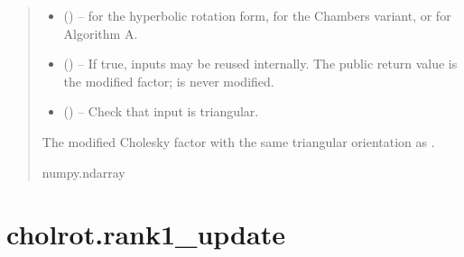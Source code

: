 \documentclass[a4paper,11pt,english]{sphinxmanual}
\begin{document}
\begin{fulllineitems}
\begin{quote}
\begin{description}
\begin{itemize}
\item {} 
\sphinxAtStartPar
{} (\sphinxstyleliteralemphasis{\sphinxupquote{{[}}}\sphinxstyleliteralemphasis{\sphinxupquote{, }}\sphinxstyleliteralemphasis{\sphinxupquote{, }}\sphinxstyleliteralemphasis{\sphinxupquote{, }}\sphinxstyleliteralemphasis{\sphinxupquote{{]}}}) –  for the hyperbolic rotation form,  for the Chambers
variant, or  for Algorithm A.

\item {} 
\sphinxAtStartPar
{} () – If true, inputs may be reused internally. The public return value is the
modified factor;  is never modified.

\item {} 
\sphinxAtStartPar
{} () – Check that input is triangular.

\end{itemize}

\sphinxAtStartPar
The modified Cholesky factor  with the same triangular orientation
as .

\sphinxAtStartPar
numpy.ndarray

\end{description}\end{quote}

\end{fulllineitems}


\sphinxstepscope


\section{cholrot.rank1\_update}
\label{\detokenize{generated/cholrot.rank1_update:cholrot-rank1-update}}\label{\detokenize{generated/cholrot.rank1_update::doc}}
\end{document}
